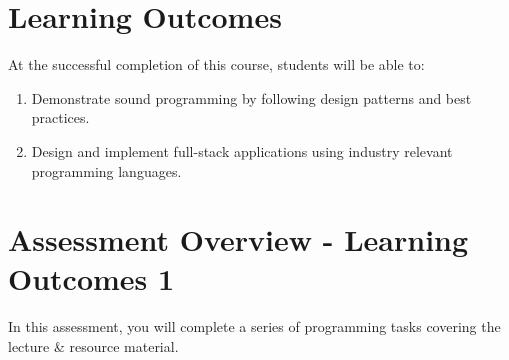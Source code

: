 \documentclass{article}
\begin{document}
\section*{Learning Outcomes}
At the successful completion of this course, students will be able to:
\begin{enumerate}
	\item Demonstrate sound programming by following design patterns and best practices.
	\item Design and implement full-stack applications using industry relevant programming languages.
\end{enumerate}

\newpage

\section*{Assessment Overview - Learning Outcomes 1}
In this assessment, you will complete a series of programming tasks covering the lecture \& resource material. \\
\end{document}
